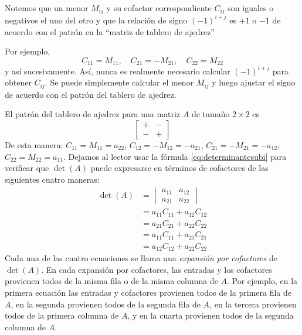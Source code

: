 Notemos que un menor $M_{ij}$ y su cofactor correspondiente $C_{ij}$ son iguales o negativos el uno del otro y que la relación de signo $(-1)^{i+j}$ es $+1$ o $-1$ de acuerdo con el patrón en la “matriz de tablero de ajedrez”
\begin{matrizn}
\end{matrizn}
Por ejemplo,
$$C_{11} = M_{11}, \quad C_{21} = -M_{21}, \quad C_{22} = M_{22}$$
\newpage\noindent
y así sucesivamente. Así, nunca es realmente necesario calcular $(-1)^{i+j}$ para obtener $C_{ij}$. Se puede simplemente calcular el menor $M_{ij}$ y luego ajustar el signo de acuerdo con el patrón del tablero de ajedrez.

\begin{examplebox}{}{}
    El patrón del tablero de ajedrez para una matriz $A$ de tamaño $2 \times 2$ es
    $$\begin{bmatrix}
        + & - \\
        - & +
    \end{bmatrix}$$
    De esta manera: $C_{11} = M_{11} = a_{22}$, $C_{12} = -M_{12} = -a_{21}$, $C_{21} = -M_{21} = -a_{12}$, $C_{22} = M_{22} = a_{11}$. Dejamos al lector usar la fórmula \eqref{eq:determinantesubi} para verificar que $\det(A)$ puede expresarse en términos de cofactores de las siguientes cuatro maneras:
    \begin{equation}
        \begin{aligned}
            \det(A) & = \begin{vmatrix} a_{11} & a_{12} \\ a_{21} & a_{22} \end{vmatrix} \\
            & = a_{11} C_{11} + a_{12} C_{12} \\
            & = a_{21} C_{21} + a_{22} C_{22} \\
            & = a_{11} C_{11} + a_{21} C_{21} \\
            & = a_{12} C_{12} + a_{22} C_{22}
        \end{aligned} \label{eq:determinanpcofactores}
    \end{equation}
    Cada una de las cuatro ecuaciones se llama una \emph{expansión por cofactores} de $\det(A)$. En cada expansión por cofactores, las entradas y los cofactores provienen todos de la misma fila o de la misma columna de $A$. Por ejemplo, en la primera ecuación las entradas y cofactores provienen todos de la primera fila de $A$, en la segunda provienen todos de la segunda fila de $A$, en la tercera provienen todos de la primera columna de $A$, y en la cuarta provienen todos de la segunda columna de $A$.
\end{examplebox}

